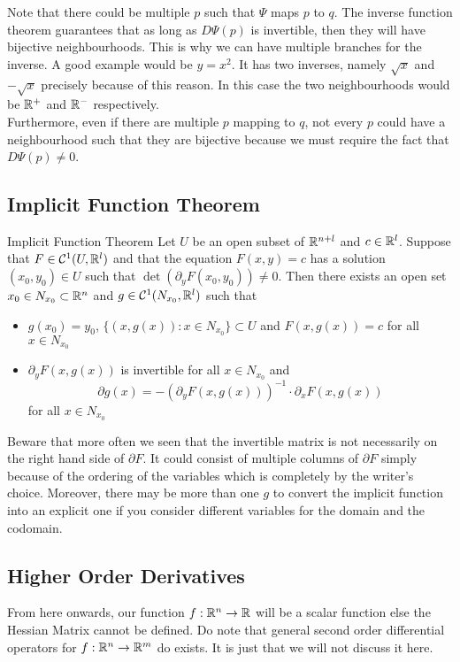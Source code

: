 \documentclass[a4paper]{article}
\begin{document}
Note that there could be multiple $p$ such that $\Psi$ maps $p$ to $q$. The inverse function theorem guarantees that as long as $D\Psi(p)$ is invertible, then they will have bijective neighbourhoods. This is why we can have multiple branches for the inverse. A good example would be $y=x^2$. It has two inverses, namely $\sqrt{x}$ and $-\sqrt{x}$ precisely because of this reason. In this case the two neighbourhoods would be $\mathbb{R}^+$ and $\mathbb{R}^-$ respectively. \\

Furthermore, even if there are multiple $p$ mapping to $q$, not every $p$ could have a neighbourhood such that they are bijective because we must require the fact that $D\Psi(p)\neq 0$. 

\subsection{Implicit Function Theorem}
\begin{thm}{Implicit Function Theorem}{} Let $U$ be an open subset of $\mathbb{R}^{n+l}$ and $c\in\mathbb{R}^l$. Suppose that $F\in\mathcal{C}^1(U,\mathbb{R}^l)$ and that the equation $F(x,y)=c$ has a solution $(x_0,y_0)\in U$ such that $\det(\partial_yF(x_0,y_0))\neq 0$. Then there exists an open set $x_0\in N_{x_0}\subset\mathbb{R}^n$ and $g\in\mathcal{C}^1(N_{x_0},\mathbb{R}^l)$ such that 
\begin{itemize}
\item $g(x_0)=y_0$, $\{(x,g(x)):x\in N_{x_0}\}\subset U$ and $F(x,g(x))=c$ for all $x\in N_{x_0}$
\item $\partial_yF(x,g(x))$ is invertible for all $x\in N_{x_0}$ and $$\partial g(x)=-(\partial_yF(x,g(x)))^{-1}\cdot\partial_xF(x,g(x))$$ for all $x\in N_{x_0}$
\end{itemize}
\end{thm}

Beware that more often we seen that the invertible matrix is not necessarily on the right hand side of $\partial F$. It could consist of multiple columns of $\partial F$ simply because of the ordering of the variables which is completely by the writer's choice. Moreover, there may be more than one $g$ to convert the implicit function into an explicit one if you consider different variables for the domain and the codomain. 

\subsection{Higher Order Derivatives}
From here onwards, our function $f:\mathbb{R}^n\to\mathbb{R}$ will be a scalar function else the Hessian Matrix cannot be defined. Do note that general second order differential operators for $f:\mathbb{R}^n\to\mathbb{R}^m$ do exists. It is just that we will not discuss it here. 
\end{document}
